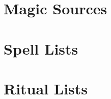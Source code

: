 
\section{Magic Sources}\label{Magic Sources}

  

  \newpage
\section{Spell Lists}\label{Spell Lists}

  

  

\section{Ritual Lists}\label{Ritual Lists}

  

  
